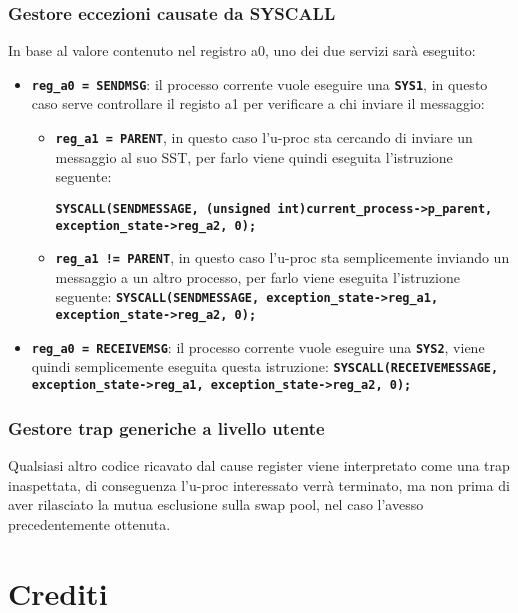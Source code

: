 \documentclass{article}
\begin{document}
\subsubsection{Gestore eccezioni causate da SYSCALL}
In base al valore contenuto nel registro a0, uno dei due servizi sarà eseguito:
\begin{itemize}
  \item \texttt{\textbf{reg\_a0 = SENDMSG}}: il processo corrente vuole eseguire una \texttt{\textbf{SYS1}},
    in questo caso serve controllare il registo a1 per verificare a chi inviare il messaggio:
    \begin{itemize}
      \item \texttt{\textbf{reg\_a1 = PARENT}}, in questo caso l'u-proc sta cercando di inviare 
        un messaggio al suo SST, per farlo viene quindi eseguita l'istruzione seguente: 

        \texttt{\textbf{SYSCALL(SENDMESSAGE, (unsigned int)current\_process->p\_parent, \newline 
        exception\_state->reg\_a2, 0);}}
      \item \texttt{\textbf{reg\_a1 != PARENT}}, in questo caso l'u-proc sta semplicemente inviando un 
        messaggio a un altro processo, per farlo viene eseguita l'istruzione seguente: \newline
        \texttt{\textbf{SYSCALL(SENDMESSAGE, exception\_state->reg\_a1, \newline 
        exception\_state->reg\_a2, 0);}}
    \end{itemize}
  \item \texttt{\textbf{reg\_a0 = RECEIVEMSG}}: il processo corrente vuole eseguire una \texttt{\textbf{SYS2}}, viene quindi semplicemente eseguita questa istruzione: \newline 
    \texttt{\textbf{SYSCALL(RECEIVEMESSAGE, exception\_state->reg\_a1, exception\_state->reg\_a2, 0);}}

\end{itemize}
\subsubsection{Gestore trap generiche a livello utente}
Qualsiasi altro codice ricavato dal cause register viene interpretato come una trap inaspettata, di 
conseguenza l'u-proc interessato verrà terminato, ma non prima di aver rilasciato la mutua esclusione 
sulla swap pool, nel caso l'avesso precedentemente ottenuta.


\newpage
\section{Crediti}
\end{document}
